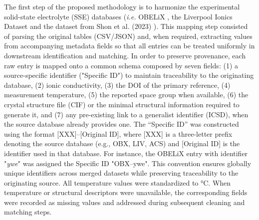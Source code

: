 \documentclass[a4paper,fleqn]{cas-sc}
\begin{document}
\begin{algorithm}
\caption{SSE Database Harmonization and Cleaning}
\label{alg:harmonization}




\end{algorithm}

The first step of the proposed methodology is to harmonize the experimental solid-state electrolyte (SSE) databases (\textit{i.e.} OBELiX \cite{therrien2025obelix}, the Liverpool Ionics Dataset \cite{durdy2023liverpool, hargreaves2023database} and the dataset from Shon et al. (2023) \cite{shon2023extracting}). This mapping step consisted of parsing the original tables (CSV/JSON) and, when required, extracting values from accompanying metadata fields so that all entries can be treated uniformly in downstream identification and matching. 
In order to preserve provenance, each raw entry is mapped onto a common schema composed by seven fields: (1) a source-specific identifier ("Specific ID") to maintain traceability to the originating database, (2) ionic conductivity, (3) the DOI of the primary reference, (4) measurement temperature, (5) the reported space group when available, (6) the crystal structure file (CIF) or the minimal structural information required to generate it, and (7) any pre-existing link to a generalist identifier (ICSD), when the source database already provides one. The “Specific ID” was constructed using the format [XXX]–[Original ID], where [XXX] is a three-letter prefix denoting the source database (e.g., OBX, LIV, ACS) and [Original ID] is the identifier used in that database. For instance, the OBELiX entry with identifier "\textit{ywe}" was assigned the Specific ID "OBX–ywe". This convention ensures globally unique identifiers across merged datasets while preserving traceability to the originating source. All temperature values were standardized to °C. When temperature or structural descriptors were unavailable, the corresponding fields were recorded as missing values and addressed during subsequent cleaning and matching steps.
\end{document}
